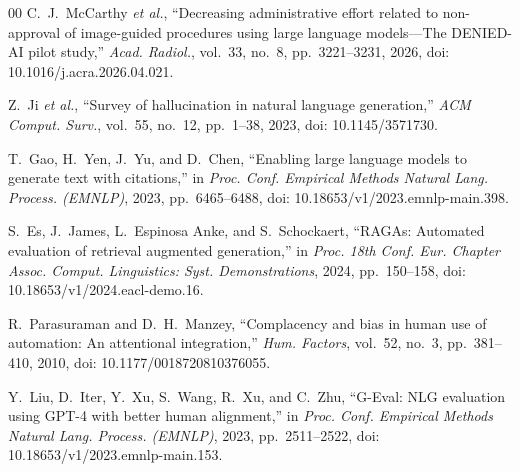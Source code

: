 \documentclass[conference]{IEEEtran}
\begin{document}
\begin{thebibliography}{00}
C.~J.~McCarthy \textit{et al.}, ``Decreasing administrative effort related to non-approval of image-guided procedures using large language models---The DENIED-AI pilot study,'' \emph{Acad. Radiol.}, vol.~33, no.~8, pp.~3221--3231, 2026, doi: 10.1016/j.acra.2026.04.021.

Z.~Ji \textit{et al.}, ``Survey of hallucination in natural language generation,'' \emph{ACM Comput. Surv.}, vol.~55, no.~12, pp.~1--38, 2023, doi: 10.1145/3571730.

T.~Gao, H.~Yen, J.~Yu, and D.~Chen, ``Enabling large language models to generate text with citations,'' in \emph{Proc. Conf. Empirical Methods Natural Lang. Process. (EMNLP)}, 2023, pp.~6465--6488, doi: 10.18653/v1/2023.emnlp-main.398.

S.~Es, J.~James, L.~Espinosa Anke, and S.~Schockaert, ``RAGAs: Automated evaluation of retrieval augmented generation,'' in \emph{Proc. 18th Conf. Eur. Chapter Assoc. Comput. Linguistics: Syst. Demonstrations}, 2024, pp.~150--158, doi: 10.18653/v1/2024.eacl-demo.16.

R.~Parasuraman and D.~H.~Manzey, ``Complacency and bias in human use of automation: An attentional integration,'' \emph{Hum. Factors}, vol.~52, no.~3, pp.~381--410, 2010, doi: 10.1177/0018720810376055.

Y.~Liu, D.~Iter, Y.~Xu, S.~Wang, R.~Xu, and C.~Zhu, ``G-Eval: NLG evaluation using GPT-4 with better human alignment,'' in \emph{Proc. Conf. Empirical Methods Natural Lang. Process. (EMNLP)}, 2023, pp.~2511--2522, doi: 10.18653/v1/2023.emnlp-main.153.

\end{thebibliography}
\end{document}
